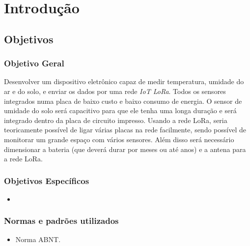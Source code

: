 \chapter{Introdução} \label{chapter:intro}

\par 

\vspace{-0.1cm}

\section{Objetivos}

\subsection{Objetivo Geral}
Desenvolver um dispositivo eletrônico capaz de medir temperatura, umidade do ar
e do solo, e enviar os dados por uma rede \textit{IoT LoRa}. Todos os sensores integrados numa placa
de baixo custo e baixo consumo de energia.
O sensor de umidade do solo será capacitivo para que ele tenha uma longa duração e será integrado
dentro da placa de circuito impresso.
Usando a rede LoRa, seria teoricamente possível de ligar várias placas na rede facilmente, sendo
possível de monitorar um grande espaço com vários sensores.
Além disso será necessário dimensionar a bateria (que deverá durar por meses ou até anos) e a antena
para a rede LoRa.

\subsection{Objetivos Específicos}
\begin{itemize}
\itemsep0em\item 

\end{itemize}

\subsection{Normas e padrões utilizados}

\begin{itemize}
\itemsep0em\item Norma ABNT.

\end{itemize}

